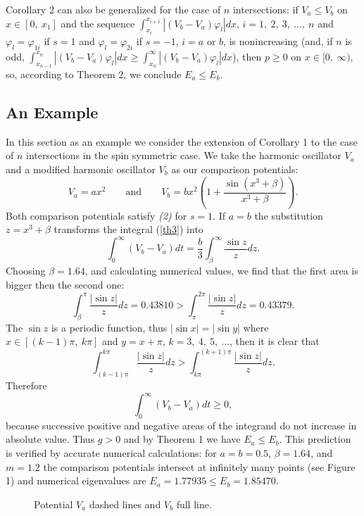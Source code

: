 \documentclass[amsmath,amssymb,superscriptaddress,showkeys, showpacs, aps, nofootinbib]{revtex4}
\begin{document}
Corollary 2 can also be generalized for the case of $n$ intersections: if $V_a\le V_b$ on $x\in[0,\ x_1]$ and the sequence $\int_{x_i}^{x_{i+1}}|(V_b-V_a)\varphi_{l}|dx$, $i=1,\ 2,\ 3,\ \ldots,\ n$ and $\varphi_l=\varphi_{1i}$ if $s=1$ and $\varphi_l=\varphi_{2i}$ if $s=-1$, $i=a$ or $b$, is nonincreasing (and, if $n$ is odd, $\int_{x_{n-1}}^{x_n}|(V_b-V_a)\varphi_{l}|dx\ge\int_{x_n}^\infty|(V_b-
V_a)\varphi_{l}|dx$), then $p\ge 0$ on $x\in[0,\ \infty)$, so, according to Theorem 2, we conclude $E_a\le E_b$.

\subsection{An Example}
In this section as an example we consider the extension of Corollary 1 to the case of $n$ intersections in the spin symmetric case. We take the harmonic oscillator $V_a$ and a modified harmonic oscillator $V_b$ as our comparison potentials:
\begin{equation*}
V_a=ax^2 \qquad \text{and} \qquad 
V_b=bx^2\left(1+\frac{\sin(x^3+\beta)}{x^3+\beta}\right).
\end{equation*}
Both comparison potentials satisfy {\it(2)} for $s=1$. If $a=b$ the substitution $z=x^3+\beta$ transforms the integral (\ref{th3}) into
\begin{equation*}
\int_0^\infty (V_b-V_a)dt=\frac{b}{3}\int_\beta^\infty\frac{\sin z}{z}dz. 
\end{equation*}
Choosing $\beta=1.64$, and calculating numerical values, we find that the first area is bigger then the second one:
\begin{equation*}
\int_\beta^\pi \frac{|\sin z|}{z}dz =0.43810>\int_\pi^{2\pi} \frac{|\sin z|}{z}dz=0.43379.
\end{equation*} 
The $\sin z$ is a periodic function, thus $|\sin x|=|\sin y|$ where $x\in[(k-1)\pi,\ k\pi]$ and $y=x+\pi$, $k=3,\ 4,\ 5,\ \ldots$, then it is clear that 
\begin{equation*}
\int_{(k-1)\pi}^{k\pi} \frac{|\sin z|}{z}dz >\int_{k\pi}^{(k+1)\pi} \frac{|\sin z|}{z}dz.
\end{equation*}
Therefore 
\begin{equation*}
\int_0^\infty (V_b-V_a)dt\ge 0,
\end{equation*}
because successive positive and negative areas of the integrand do not increase in absolute value. Thus $g>0$ and by Theorem 1 we have $E_a\le E_b$.  
This prediction is verified by accurate numerical calculations:
for $a=b=0.5$, $\beta=1.64$, and $m=1.2$ the comparison potentials intersect at infinitely many points (see Figure 1) and numerical eigenvalues are $E_a=1.77935\le E_b=1.85470$.
\begin{figure}
\caption{Potential $V_a$ dashed lines and $V_b$ full line.}
\end{figure}
\end{document}
